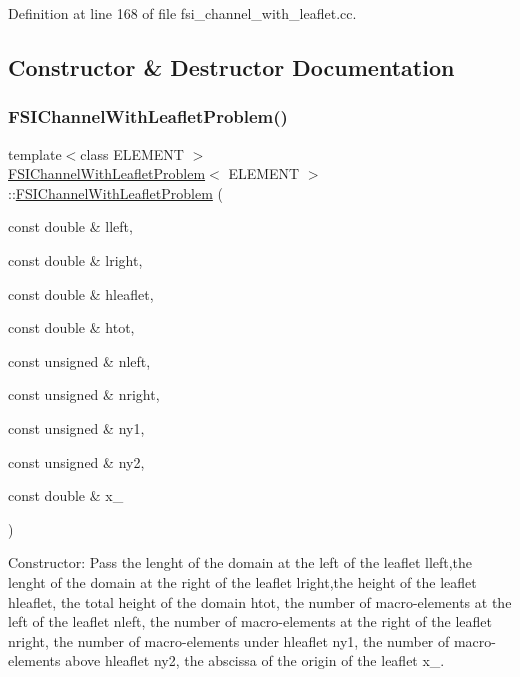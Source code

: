 Definition at line 168 of file fsi\+\_\+channel\+\_\+with\+\_\+leaflet.\+cc.



\subsection{Constructor \& Destructor Documentation}
\mbox{\label{classFSIChannelWithLeafletProblem_aaa0a455e91c4fb2dd9696607b802d01b}} 
\subsubsection{\texorpdfstring{F\+S\+I\+Channel\+With\+Leaflet\+Problem()}{FSIChannelWithLeafletProblem()}}
{\footnotesize\ttfamily template$<$class E\+L\+E\+M\+E\+NT $>$ \\
\hyperlink{classFSIChannelWithLeafletProblem}{F\+S\+I\+Channel\+With\+Leaflet\+Problem}$<$ E\+L\+E\+M\+E\+NT $>$\+::\hyperlink{classFSIChannelWithLeafletProblem}{F\+S\+I\+Channel\+With\+Leaflet\+Problem} (\begin{DoxyParamCaption}\item[{const double \&}]{lleft,  }\item[{const double \&}]{lright,  }\item[{const double \&}]{hleaflet,  }\item[{const double \&}]{htot,  }\item[{const unsigned \&}]{nleft,  }\item[{const unsigned \&}]{nright,  }\item[{const unsigned \&}]{ny1,  }\item[{const unsigned \&}]{ny2,  }\item[{const double \&}]{x\+\_ }\end{DoxyParamCaption})}



Constructor\+: Pass the lenght of the domain at the left of the leaflet lleft,the lenght of the domain at the right of the leaflet lright,the height of the leaflet hleaflet, the total height of the domain htot, the number of macro-\/elements at the left of the leaflet nleft, the number of macro-\/elements at the right of the leaflet nright, the number of macro-\/elements under hleaflet ny1, the number of macro-\/elements above hleaflet ny2, the abscissa of the origin of the leaflet x\+\_. 

